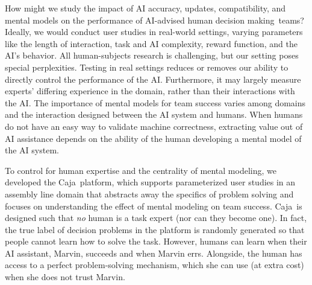 \documentclass[letterpaper]{article} %
\newcommand{\bug}
    {\mbox{\rule{2mm}{2mm}}}
\newcommand{\Bug}[1]
    {\bug \footnote{BUG: {#1}}}
\newcommand{\?}{\mbox{?}}
\newcommand{\name}{AI-advised human decision making}
\newcommand{\plat}{{\sc Caja}}
\begin{document}
How might we study the impact of AI accuracy, updates, compatibility, and mental models on the performance of \name\ teams? Ideally, we would conduct user studies in real-world settings, varying parameters like the length of interaction, task and AI complexity, reward function, and the AI's behavior. All human-subjects research is challenging, but our setting poses special perplexities. Testing in real settings reduces or removes our ability to directly control the performance of the AI. Furthermore, it may largely measure experts' differing experience in the domain, rather than their interactions with the AI.
The importance of mental models for team success
varies among domains and the interaction designed between the AI system and humans. When humans do not have an easy way to validate machine correctness, extracting value out of AI assistance depends on the ability of the human developing a mental model of the AI system. 

To control for human expertise and the centrality of mental modeling, we developed the \plat\ platform, which supports parameterized user studies in an assembly line domain that abstracts away the specifics of problem solving and focuses on understanding the effect of mental modeling on team success. \plat\ is designed such that {\em no} human is a task expert (nor can they become one). In fact, the true label of decision problems in the platform is randomly generated so that people cannot learn how to solve the task. However, humans can learn when their AI assistant, Marvin, succeeds and when Marvin errs. Alongside, the human has access to a perfect problem-solving mechanism, which she can use (at extra cost) when she does not trust Marvin. 
\end{document}
